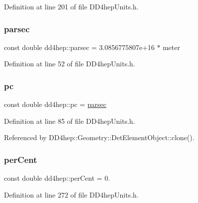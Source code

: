 Definition at line 201 of file D\+D4hep\+Units.\+h.

\hypertarget{namespacedd4hep_a6d097c8b8fee88c7f77ebdfe2923ac45}{}\label{namespacedd4hep_a6d097c8b8fee88c7f77ebdfe2923ac45} 
\subsubsection{\texorpdfstring{parsec}{parsec}}
{\footnotesize\ttfamily const double dd4hep\+::parsec = 3.\+0856775807e+16 $\ast$ meter\hspace{0.3cm}{\ttfamily [static]}}



Definition at line 52 of file D\+D4hep\+Units.\+h.

\hypertarget{namespacedd4hep_a463cd79bb27007361a510abb0d10665d}{}\label{namespacedd4hep_a463cd79bb27007361a510abb0d10665d} 
\subsubsection{\texorpdfstring{pc}{pc}}
{\footnotesize\ttfamily const double dd4hep\+::pc = \hyperlink{namespacedd4hep_a6d097c8b8fee88c7f77ebdfe2923ac45}{parsec}\hspace{0.3cm}{\ttfamily [static]}}



Definition at line 85 of file D\+D4hep\+Units.\+h.



Referenced by D\+D4hep\+::\+Geometry\+::\+Det\+Element\+Object\+::clone().

\hypertarget{namespacedd4hep_a403b2fd7b19ff0bf0a3803d7907bf84a}{}\label{namespacedd4hep_a403b2fd7b19ff0bf0a3803d7907bf84a} 
\subsubsection{\texorpdfstring{per\+Cent}{perCent}}
{\footnotesize\ttfamily const double dd4hep\+::per\+Cent = 0.\hspace{0.3cm}{\ttfamily [static]}}



Definition at line 272 of file D\+D4hep\+Units.\+h.

\hypertarget{namespacedd4hep_a3c86fbb277949a5ee64673266d8f9f93}{}\label{namespacedd4hep_a3c86fbb277949a5ee64673266d8f9f93} 
